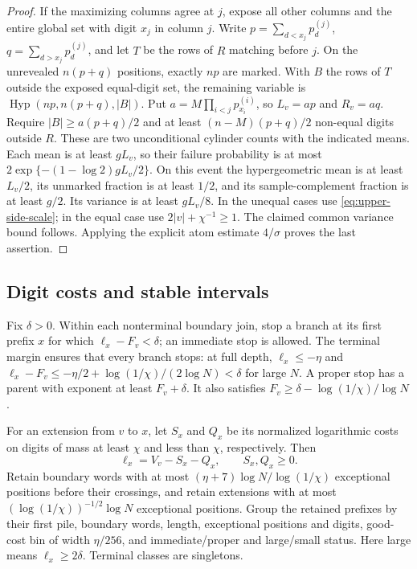\documentclass[11pt]{article}
\numberwithin{equation}{section}
\theoremstyle{definition}
\theoremstyle{remark}
\newcommand{\1}{\mathbf 1}
\begin{document}
\begin{proof}
If the maximizing columns agree at $j$, expose all other columns and
the entire global set with digit $x_j$ in column $j$. Write
$p=\sum_{d<x_j}p_d^{(j)}$, $q=\sum_{d>x_j}p_d^{(j)}$, and let
$T$ be the rows of $R$ matching before $j$. On the unrevealed
$n(p+q)$ positions, exactly $np$ are marked. With $B$ the rows of
$T$ outside the exposed equal-digit set, the remaining variable is
$\operatorname{Hyp}(np,n(p+q),|B|)$.
Put $a=M\prod_{i<j}p_{x_i}^{(i)}$, so $L_v=ap$ and $R_v=aq$.
Require $|B|\ge a(p+q)/2$ and at least $(n-M)(p+q)/2$
non-equal digits outside $R$. These are two unconditional cylinder
counts with the indicated means. Each mean is at least $gL_v$,
so their failure probability is at most
$2\exp\{-(1-\log2)gL_v/2\}$. On this event the hypergeometric
mean is at least $L_v/2$, its unmarked fraction is at least $1/2$,
and its sample-complement fraction is at least $g/2$. Its variance
is at least $gL_v/8$.
In the unequal cases use \eqref{eq:upper-side-scale}; in the equal
case use $2|v|+\chi^{-1}\ge1$. The claimed common variance bound
follows. Applying the explicit atom estimate $4/\sigma$ proves the
last assertion.
\end{proof}

\subsection{Digit costs and stable intervals}
Fix $\delta>0$. Within each nonterminal boundary join, stop a branch
at its first prefix $x$ for which $\ell_x-F_v<\delta$; an immediate
stop is allowed. The terminal margin ensures that every branch stops:
at full depth, $\ell_x\le-\eta$ and
$\ell_x-F_v\le-\eta/2+\log(1/\chi)/(2\log N)<\delta$ for large $N$.
A proper stop has a parent with exponent at least $F_v+\delta$.
It also satisfies $F_v\ge\delta-\log(1/\chi)/\log N$.

For an extension from $v$ to $x$, let $S_x$ and $Q_x$ be its
normalized logarithmic costs on digits of mass at least $\chi$ and
less than $\chi$, respectively. Then
\begin{equation}\label{eq:upper-cost-split}
 \ell_x=V_v-S_x-Q_x,\qquad S_x,Q_x\ge0.
\end{equation}
Retain boundary words with at most
$(\eta+7)\log N/\log(1/\chi)$ exceptional positions before their
crossings, and retain extensions with at most
$(\log(1/\chi))^{-1/2}\log N$ exceptional positions.
Group the retained prefixes by their first pile, boundary words,
length, exceptional positions and digits, good-cost bin of width
$\eta/256$, and immediate/proper and large/small status. Here large
means $\ell_x\ge2\delta$. Terminal classes are singletons.
\end{document}

